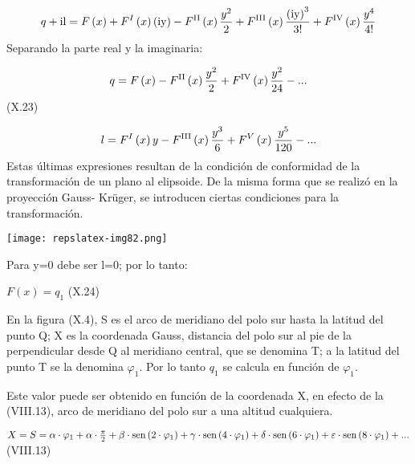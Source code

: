 \documentclass{tufte-book}
\newcommand\normalsubformula[1]{\text{\mathversion{normal}$#1$}}
\begin{document}
\begin{equation*}
{q+\normalsubformula{\text{il}}=F\left(x\right)+F^{{I}}\left(x\right)\left(\normalsubformula{\text{iy}}\right)-F^{{\normalsubformula{\text{II}}}}\left(x\right)\frac{y^{{2}}}{2}+F^{{\normalsubformula{\text{III}}}}\left(x\right)\frac{\left(\normalsubformula{\text{iy}}\right)^{{3}}}{3!}+F^{{\normalsubformula{\text{IV}}}}\left(x\right)\frac{y^{{4}}}{4!}}
\end{equation*}
Separando la parte real y la imaginaria:

\begin{equation*}
{q=F\left(x\right)-F^{{\normalsubformula{\text{II}}}}\left(x\right)\frac{y^{{2}}}{2}+F^{{\normalsubformula{\text{IV}}}}\left(x\right)\frac{y^{{2}}}{\text{24}}-\text{.}\text{.}\text{.}}
\end{equation*}
 (X.23)

\begin{equation*}
{l=F^{{I}}\left(x\right)y-F^{{\normalsubformula{\text{III}}}}\left(x\right)\frac{y^{{3}}}{6}+F^{{V}}\left(x\right)\frac{y^{{5}}}{\text{120}}-\text{.}\text{.}\text{.}}
\end{equation*}
Estas últimas expresiones resultan de la condición de conformidad de
la transformación de un plano al elipsoide. De la misma forma que se
realizó en la proyección Gauss- Kr\"uger, se introducen ciertas
condiciones para la transformación.

\begin{marginfigure}
\texttt{[image: repslatex-img82.png]}
\end{marginfigure}
 

Para y=0 debe ser l=0; por lo tanto:

 ${F\left(x\right)=q_{{1}}}$  (X.24)

En la figura (X.4), S es el arco de meridiano del polo sur hasta la
latitud del punto Q; X es la coordenada Gauss, distancia del polo sur
al pie de la perpendicular desde Q al meridiano central, que se
denomina T; a la latitud del punto T se la denomina  ${\varphi
_{{1}}}$. Por lo tanto  ${q_{{1}}}$ se calcula en función de 
${\varphi _{{1}}}$.

Este valor puede ser obtenido en función de la coordenada X, en efecto
de la (VIII.13), arco de meridiano del polo sur a una altitud
cualquiera.

 ${X=S=\alpha \cdot \varphi _{{1}}+\alpha \cdot {\frac{\pi }{2}}+\beta
\cdot \normalsubformula{\text{sen}}\left(2\cdot \varphi
_{{1}}\right)+\gamma \cdot \normalsubformula{\text{sen}}\left(4\cdot
\varphi _{{1}}\right)+\delta \cdot
\normalsubformula{\text{sen}}\left(6\cdot \varphi
_{{1}}\right)+\varepsilon \cdot
\normalsubformula{\text{sen}}\left(8\cdot \varphi
_{{1}}\right)+\text{.}\text{.}\text{.}}$ (VIII.13)
\end{document}
